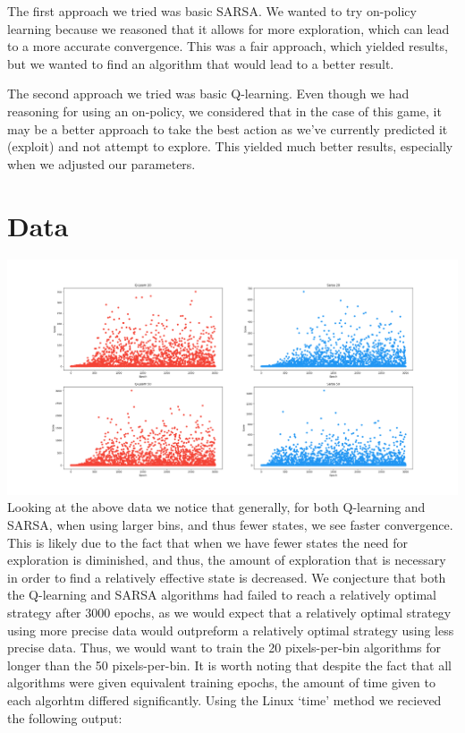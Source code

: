 \documentclass[11pt]{article}
\begin{document}
The first approach we tried was basic SARSA. We wanted to try on-policy learning because we reasoned that it allows for more exploration, which can lead to a more accurate convergence. This was a fair approach, which yielded results, but we wanted to find an algorithm that would lead to a better result.

The second approach we tried was basic Q-learning. Even though we had reasoning for using an on-policy, we considered that  in the case of this game, it may be a better approach to take the best action as we've currently predicted it (exploit) and not attempt to explore. This yielded much better results, especially when we adjusted our parameters.



\section{Data}
\includegraphics[width=20cm]{../figures/points.png}\\
Looking at the above data we notice that generally, for both Q-learning and SARSA, when using larger bins, and thus fewer states, we see faster convergence. This is likely due to the fact that when we have fewer states the need for exploration is diminished, and thus, the amount of exploration that is necessary in order to find a relatively effective state is decreased. We conjecture that both the Q-learning and SARSA algorithms had failed to reach a relatively optimal strategy after 3000 epochs, as we would expect that a relatively optimal strategy using more precise data would outpreform a relatively optimal strategy using less precise data. Thus, we would want to train the 20 pixels-per-bin algorithms for longer than the 50 pixels-per-bin. It is worth noting that despite the fact that all algorithms were given equivalent training epochs, the amount of time given to each algorhtm differed significantly. Using the Linux `time' method we recieved the following output:
\end{document}

